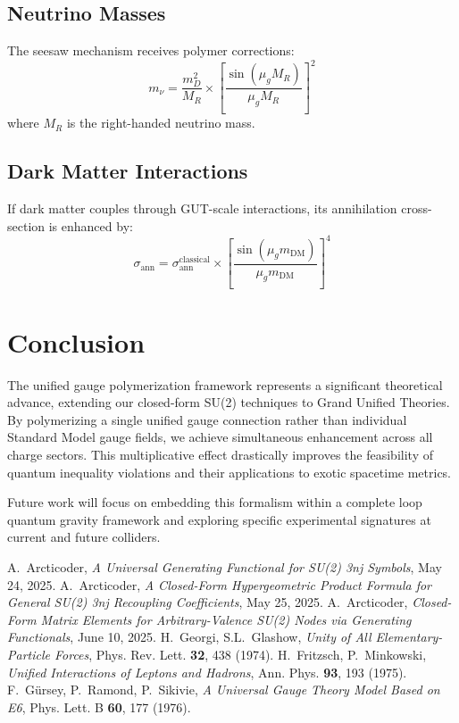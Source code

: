 \documentclass[11pt]{article}
\begin{document}
\subsection{Neutrino Masses}
The seesaw mechanism receives polymer corrections:
\begin{equation}
m_\nu = \frac{m_D^2}{M_R} \times \left[\frac{\sin(\mu_g M_R)}{\mu_g M_R}\right]^2
\end{equation}
where $M_R$ is the right-handed neutrino mass.

\subsection{Dark Matter Interactions}
If dark matter couples through GUT-scale interactions, its annihilation cross-section is enhanced by:
\begin{equation}
\sigma_{\text{ann}} = \sigma_{\text{ann}}^{\text{classical}} \times \left[\frac{\sin(\mu_g m_{\text{DM}})}{\mu_g m_{\text{DM}}}\right]^4
\end{equation}

\section{Conclusion}

The unified gauge polymerization framework represents a significant theoretical advance, extending our closed-form SU(2) techniques to Grand Unified Theories. By polymerizing a single unified gauge connection rather than individual Standard Model gauge fields, we achieve simultaneous enhancement across all charge sectors. This multiplicative effect drastically improves the feasibility of quantum inequality violations and their applications to exotic spacetime metrics.

Future work will focus on embedding this formalism within a complete loop quantum gravity framework and exploring specific experimental signatures at current and future colliders.

\begin{thebibliography}{9}
 A.~Arcticoder, \textit{A Universal Generating Functional for SU(2) 3nj Symbols}, May 24, 2025.
 A.~Arcticoder, \textit{A Closed-Form Hypergeometric Product Formula for General SU(2) 3nj Recoupling Coefficients}, May 25, 2025.
 A.~Arcticoder, \textit{Closed-Form Matrix Elements for Arbitrary-Valence SU(2) Nodes via Generating Functionals}, June 10, 2025.
 H.~Georgi, S.L.~Glashow, \textit{Unity of All Elementary-Particle Forces}, Phys. Rev. Lett. \textbf{32}, 438 (1974).
 H.~Fritzsch, P.~Minkowski, \textit{Unified Interactions of Leptons and Hadrons}, Ann. Phys. \textbf{93}, 193 (1975).
 F.~Gürsey, P.~Ramond, P.~Sikivie, \textit{A Universal Gauge Theory Model Based on E6}, Phys. Lett. B \textbf{60}, 177 (1976).
\end{thebibliography}
\end{document}
